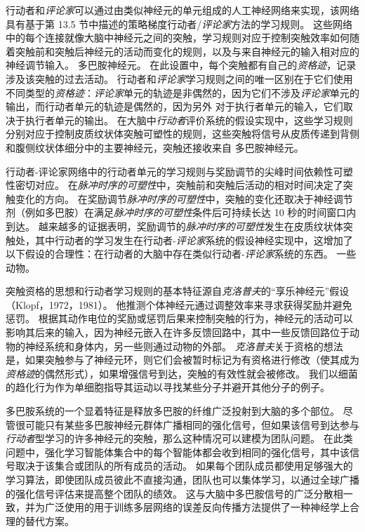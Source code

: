 行动者和\textit{评论家}可以通过由类似神经元的单元组成的人工神经网络来实现，该网络具有基于第 13.5 节中描述的策略梯度行动者/\textit{评论家}方法的学习规则。
这些网络中的每个连接就像大脑中神经元之间的突触，学习规则对应于控制突触效率如何随着突触前和突触后神经元的活动而变化的规则，以及与来自神经元的输入相对应的神经调节输入。
多巴胺神经元。
在此设置中，每个突触都有自己的\textit{资格迹}，记录涉及该突触的过去活动。
行动者和\textit{评论家}学习规则之间的唯一区别在于它们使用不同类型的\textit{资格迹}：\textit{评论家}单元的轨迹是非偶然的，因为它们不涉及\textit{评论家}单元的输出，而行动者单元的轨迹是偶然的，因为另外 对于执行者单元的输入，它们取决于执行者单元的输出。
在大脑中\textit{行动者}评价系统的假设实现中，这些学习规则分别对应于控制皮质纹状体突触可塑性的规则，这些突触将信号从皮质传递到背侧和腹侧纹状体细分中的主要神经元，突触还接收来自 多巴胺神经元。


行动者-评论家网络中的行动者单元的学习规则与奖励调节的尖峰时间依赖性可塑性密切对应。
在\textit{脉冲时序的可塑性}中，突触前和突触后活动的相对时间决定了突触变化的方向。
在奖励调节\textit{脉冲时序的可塑性}中，突触的变化还取决于神经调节剂（例如多巴胺）在满足\textit{脉冲时序的可塑性}条件后可持续长达 10 秒的时间窗口内到达。
越来越多的证据表明，奖励调节的\textit{脉冲时序的可塑性}发生在皮质纹状体突触处，其中行动者的学习发生在行动者-\textit{评论家}系统的假设神经实现中，这增加了以下假设的合理性：在行动者的大脑中存在类似行动者-\textit{评论家}系统的东西。 一些动物。


突触资格的思想和行动者学习规则的基本特征源自\textit{克洛普夫}的“享乐神经元”假设（Klopf，1972，1981）。
他推测个体神经元通过调整效率来寻求获得奖励并避免惩罚。
根据其动作电位的奖励或惩罚后果来控制突触的行为，神经元的活动可以影响其后来的输入，因为神经元嵌入在许多反馈回路中，其中一些反馈回路位于动物的神经系统和身体内，另一些则通过动物的外部。
\textit{克洛普夫}关于资格的想法是，如果突触参与了神经元环，则它们会被暂时标记为有资格进行修改（使其成为\textit{资格迹}的偶然形式），如果增强信号到达，突触的有效性就会被修改。
我们以细菌的趋化行为作为单细胞指导其运动以寻找某些分子并避开其他分子的例子。


多巴胺系统的一个显着特征是释放多巴胺的纤维广泛投射到大脑的多个部位。
尽管很可能只有某些多巴胺神经元群体广播相同的强化信号，但如果该信号到达参与\textit{行动者}型学习的许多神经元的突触，那么这种情况可以建模为团队问题。
在此类问题中，强化学习智能体集合中的每个智能体都会收到相同的强化信号，其中该信号取决于该集合或团队的所有成员的活动。
如果每个团队成员都使用足够强大的学习算法，即使团队成员彼此不直接沟通，团队也可以集体学习，以通过全球广播的强化信号评估来提高整个团队的绩效。
这与大脑中多巴胺信号的广泛分散相一致，并为广泛使用的用于训练多层网络的误差反向传播方法提供了一种神经学上合理的替代方案。


